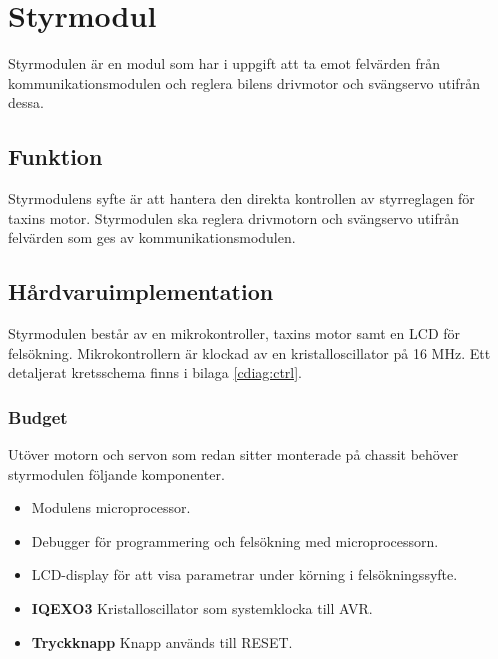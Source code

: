 \documentclass[designspec/spec.tex]{subfiles}
\begin{document}
\section{Styrmodul}
Styrmodulen är en modul som har i uppgift att ta emot felvärden från
kommunikationsmodulen och reglera bilens drivmotor och svängservo utifrån
dessa.

\subsection{Funktion}
Styrmodulens syfte är att hantera den direkta kontrollen av styrreglagen för
taxins motor. Styrmodulen ska reglera drivmotorn och svängservo utifrån
felvärden som ges av kommunikationsmodulen.

\subsection{Hårdvaruimplementation}
Styrmodulen består av en mikrokontroller, taxins motor samt en LCD för
felsökning. Mikrokontrollern är klockad av en kristalloscillator på 16 MHz. Ett
detaljerat kretsschema finns i bilaga \ref{cdiag:ctrl}.

\subsubsection{Budget}
Utöver motorn och servon som redan sitter monterade på chassit behöver
styrmodulen följande komponenter.
\begin{itemize}
	\item \textbf{\modMicrocontroller} Modulens microprocessor. 
    \item \textbf{\modJtag} Debugger för programmering och felsökning med
        microprocessorn. 
    \item \textbf{\modLcd} LCD-display för att visa parametrar under körning i
        felsökningssyfte.
    \item \textbf{IQEXO3} Kristalloscillator som systemklocka till AVR.
    \item \textbf{Tryckknapp} Knapp används till RESET.
\end{itemize}
\end{document}
